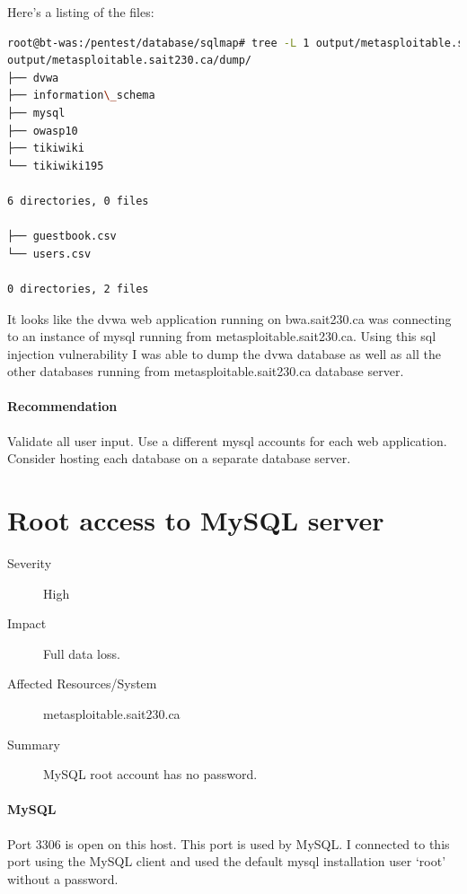 \documentclass{article}
\begin{document}
Here's a listing of the files:

\begin{lstlisting}[language=Bash,basicstyle=\tiny]
root@bt-was:/pentest/database/sqlmap# tree -L 1 output/metasploitable.sait230.ca/dump/
output/metasploitable.sait230.ca/dump/
├── dvwa
├── information\_schema
├── mysql
├── owasp10
├── tikiwiki
└── tikiwiki195

6 directories, 0 files

├── guestbook.csv
└── users.csv

0 directories, 2 files
\end{lstlisting}

It looks like the dvwa web application running on bwa.sait230.ca was connecting to an
instance of mysql running from metasploitable.sait230.ca. Using this sql injection vulnerability
I was able to dump the dvwa database as well as all the other databases
running from metasploitable.sait230.ca database server.

\paragraph{Recommendation}

Validate all user input. Use a different mysql accounts for each web application.
Consider hosting each database on a separate database server.

\newpage
\section{Root access to MySQL server}

\begin{description}
  \item[Severity] High
  \item[Impact] Full data loss.
  \item[Affected Resources/System] metasploitable.sait230.ca
  \item[Summary] MySQL root account has no password.
\end{description}

\paragraph{MySQL}
Port 3306 is open on this host. This port
is used by MySQL. I connected to this port using the MySQL client and
used the default mysql installation user `root' without a password.
\end{document}
